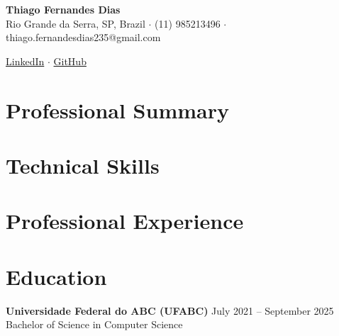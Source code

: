\documentclass[a4paper,10pt]{article}
\begin{document}
\pagestyle{empty}

\begin{center}
    {\Huge \textbf{Thiago Fernandes Dias}} \\[0.5em] %
    Rio Grande da Serra, SP, Brazil $\cdot$ (11) 985213496 $\cdot$ thiago.fernandesdias235@gmail.com %

    \href{https://www.linkedin.com/in/thiago-fernandes-dias-5b90a118a}{LinkedIn} $\cdot$ %
    \href{https://github.com/Thiago-Fernandes-Dias}{GitHub} %
\end{center}

\vspace{0.5cm}

\section*{Professional Summary}


\section*{Technical Skills}


\section*{Professional Experience}


\section*{Education}
\textbf{Universidade Federal do ABC (UFABC)} \hfill July 2021 -- September 2025 \\ %
Bachelor of Science in Computer Science %
\end{document}
